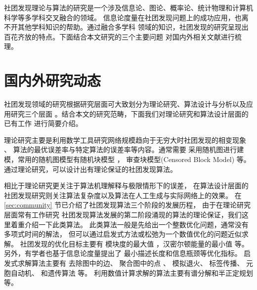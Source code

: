 社团发现理论与算法的研究是一个涉及信息论、图论、概率论、统计物理和计算机科学等多学科交叉融合的领域。
信息论度量在社团发现问题上的成功应用，也离不开其他学科知识的帮助。通过融合多学科
领域的知识，社团发现的研究呈现出百花齐放的特点。下面结合本文研究的三个主要问题
对国内外相关文献进行梳理。

\section{国内外研究动态}

社团发现领域的研究根据研究层面可大致划分为理论研究、算法设计与分析以及应用研究三个层面
\cite{ZJSH201102017}。结合本文的研究范畴，下面我们对理论研究和算法设计层面的已有工作
进行简要介绍。

理论研究主要是利用数学工具研究网络规模趋向于无穷大时社团发现的相变现象
\cite{lenka2016physics}、
算法的最优误差率与特定算法的误差率等内容。通常需要
采用随机图进行建模，常用的随机图模型有随机块模型
\cite{holland1983stochastic}，
审查块模型(Censored Block Model) \cite{hajek2015censored}等。
通过理论研究，可以设计出有理论保证的社团发现算法。%


相比于理论研究更关注于算法机理解释与极限情形下的误差，
在算法设计层面的社团发现研究则关注算法复杂度以及算法在人工生成与实际网络上的效果。
在 \ref{sec:community} 节已介绍了社团发现算法三个阶段的发展历程，
由于在理论研究层面常有工作研究
社团发现算法发展的第二阶段涌现的算法的理论保证，我们这里着重介绍一下此类算法。
此类算法一般是先给出一个整数优化问题，通常没有多项式时间的解法，
但可以通过启发式方法或松弛为一个数值优化的问题近似求解。
社团发现的优化目标主要有
模块度的最大值 \cite{newman2006modularity}，汉密尔顿能量的最小值
\cite{reichardt2004potts} 等。另外，有学者也基于信息论度量提出了
最小描述长度\cite{rosvall2007information}和信息瓶颈\cite{ziv2005bottleneck}等优化指标。
启发式求解算法主要有
去除图中的边\cite{girvan2002community}、
聚合图中的点 \cite{clauset2004finding}、
模拟退火\cite{massen2005annealing}、
标签传播\cite{raghavan2007near}、
元胞自动机\cite{chen2008automata}、
和遗传算法 \cite{pizzuti2008ga, zhu2009genetic}等。
利用数值计算求解的算法主要有谱分解\cite{coja-oghlan_2010}和半正定规划\cite{chen2012sdp}等。

